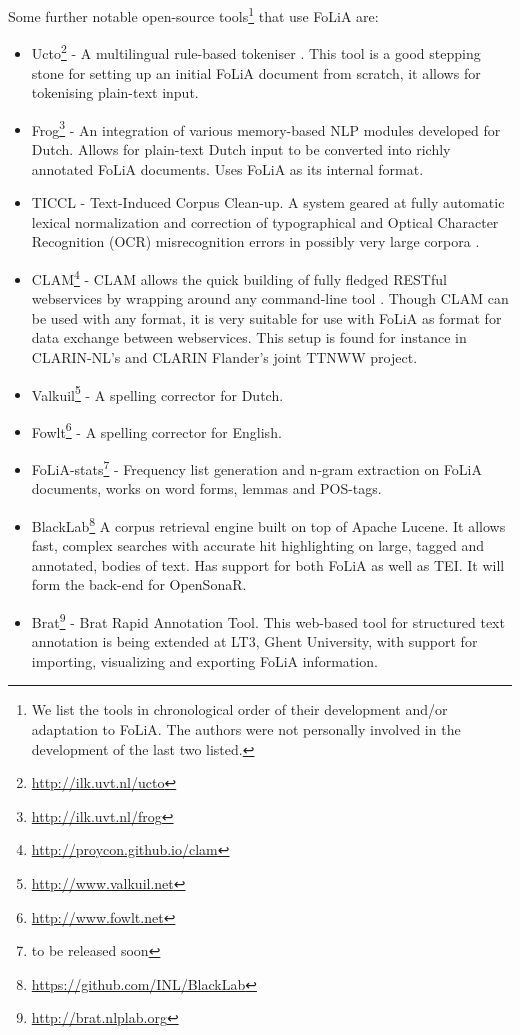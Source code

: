 \documentclass[a4paper,10pt,twoside]{article}
\begin{document}
Some further notable open-source tools\footnote{We list the tools in chronological order of their development and/or adaptation to FoLiA. The authors were not personally involved in the development of the last two listed.} that use FoLiA are:

\begin{itemize}
  \item Ucto\footnote{\url{http://ilk.uvt.nl/ucto}} - A multilingual rule-based
    tokeniser \cite{UCTO}. This tool is a good stepping stone for setting up an initial
    FoLiA document from scratch, it allows for  tokenising plain-text input.
  \item Frog\footnote{\url{http://ilk.uvt.nl/frog}} - An integration of various memory-based NLP modules developed for Dutch. Allows for plain-text Dutch input to be converted into richly
  annotated FoLiA documents. Uses FoLiA as its internal format.
 \item TICCL - Text-Induced Corpus Clean-up. A system geared at fully automatic lexical normalization and correction of typographical and Optical Character Recognition (OCR) misrecognition errors in possibly very large corpora \cite{Reynaert2010}.
  \item CLAM\footnote{\url{http://proycon.github.io/clam}} - CLAM allows the quick
   building of fully fledged RESTful webservices by wrapping around any
   command-line tool \cite{CLAM}. Though CLAM can be used with any format, it
   is very suitable for use with FoLiA as format for data exchange between
   webservices. This setup is found for instance in CLARIN-NL's and CLARIN Flander's joint TTNWW project. 
 \item Valkuil\footnote{\url{http://www.valkuil.net}} - A spelling corrector for Dutch.
 \item Fowlt\footnote{\url{http://www.fowlt.net}} - A spelling corrector for English.
 \item FoLiA-stats\footnote{to be released soon} - Frequency list generation and n-gram
   extraction on FoLiA documents, works on word forms, lemmas and POS-tags.
 \item BlackLab\footnote{\url{https://github.com/INL/BlackLab}} A corpus retrieval
   engine built on top of Apache Lucene. It allows fast, complex searches with
   accurate hit highlighting on large, tagged and annotated, bodies of text.
   Has support for both FoLiA as well as TEI. It will form the back-end for OpenSonaR.
 \item Brat\footnote{\url{http://brat.nlplab.org}} - Brat Rapid Annotation
   Tool. This web-based tool for structured text annotation is being extended at LT3, Ghent University, with support for importing, visualizing and exporting FoLiA information.
 \end{itemize}
\end{document}
